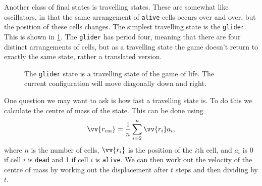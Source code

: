 \documentclass[fleqn]{NotesClass}
\begin{document}
    Another class of final states is travelling states.
    These are somewhat like oscillators, in that the same arrangement of \texttt{alive} cells occurs over and over, but the position of these cells changes.
    The simplest travelling state is the \texttt{glider}.
    This is shown in \cref{fig:game of life glider state}.
    The \texttt{glider} has period four, meaning that there are four distinct arrangements of cells, but as a travelling state the game doesn't return to exactly the same state, rather a translated version.
    
    \begin{figure}
        \caption[Game of life \texttt{glider state}]{The \texttt{glider} state is a travelling state of the game of life. The current configuration will move diagonally down and right.}
        \label{fig:game of life glider state}
    \end{figure}
    
    One question we may want to ask is how fast a travelling state is.
    To do this we calculate the centre of mass of the state.
    This can be done using
    \begin{equation}
        \vv{r_{\mathrm{cm}}} = \frac{1}{n} \sum_{i = 2}^n \vv{r_i}a_i ,
    \end{equation}
    where \(n\) is the number of cells, \(\vv{r_i}\) is the position of the \(i\)th cell, and \(a_i\) is 0 if cell \(i\) is \texttt{dead} and 1 if cell \(i\) is \texttt{alive}.
    We can then work out the velocity of the centre of mass by working out the displacement after \(t\) steps and then dividing by \(t\).
    
\end{document}
